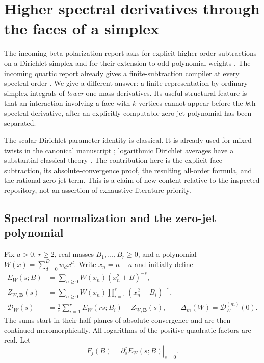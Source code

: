 \section{Higher spectral derivatives through the faces of a simplex}
\label{sd:sec:main}

The incoming beta-polarization report asks for explicit higher-order
subtractions on a Dirichlet simplex and for their extension to odd
polynomial weights \cite[Further research, items 3--4]{sd:HigherDefects}.
The incoming quartic report already gives a finite-subtraction compiler
at every spectral order \cite[Section 5]{RepoQuartic}.  We give a different
answer: a finite representation by ordinary simplex integrals of
\emph{lower} one-mass derivatives.  Its useful structural feature is that
an interaction involving a face with $k$ vertices cannot appear before
the $k$th spectral derivative, after an explicitly computable zero-jet
polynomial has been separated.

The scalar Dirichlet parameter identity is classical.  It is already
used for mixed twists in the canonical manuscript
\cite[\texttt{07-mixed-twist-identities.tex}]{RepoMain}; logarithmic
Dirichlet averages have a substantial classical theory
\cite{sd:Carlson1987,sd:Carlson1991}.  The contribution here is the explicit
face subtraction, its absolute-convergence proof, the resulting
all-order formula, and the rational zero-jet term.  This is a claim of
new content relative to the inspected repository, not an assertion of
exhaustive literature priority.

\subsection{Spectral normalization and the zero-jet polynomial}
\label{sd:subsec:setup}

Fix $a>0$, $r\ge2$, real masses $B_1,\ldots,B_r\ge0$, and a polynomial
$W(x)=\sum_{d=0}^{D}w_dx^d$.  Write $x_n=n+a$ and initially define
\begin{align}
 E_W(s;B)&=\sum_{n\ge0}W(x_n)(x_n^2+B)^{-s},
       \label{sd:eq:one}\\
 Z_{W,\boldsymbol B}(s)&=\sum_{n\ge0}W(x_n)
                    \prod_{i=1}^r(x_n^2+B_i)^{-s},\label{sd:eq:many}\\
 \mathcal D_W(s)&=\frac1r\sum_{i=1}^rE_W(rs;B_i)
                          -Z_{W,\boldsymbol B}(s),\qquad
 \Delta_m(W)=\mathcal D_W^{(m)}(0).
       \label{sd:eq:defect}
\end{align}
The sums start in their half-planes of absolute convergence and are then
continued meromorphically.  All logarithms of the positive quadratic
factors are real.  Let
\begin{equation}\label{sd:eq:jets}
 F_j(B)=\left.\partial_s^j E_W(s;B)\right|_{s=0}.
\end{equation}

